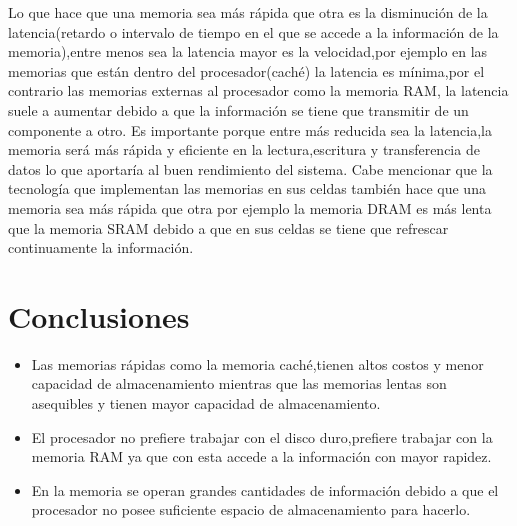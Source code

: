 \documentclass{article}
\begin{document}
Lo que hace que una memoria sea más rápida que otra es la disminución de la latencia(retardo o intervalo de tiempo en el que se  accede a la información de la memoria),entre menos sea la latencia mayor es la velocidad,por ejemplo en las memorias que están dentro del procesador(caché) la latencia es mínima,por el contrario las memorias externas al  procesador como la memoria RAM,  la latencia suele a aumentar debido a que  la información se tiene que transmitir de un componente a otro. 
Es importante  porque entre más reducida sea la latencia,la memoria será más rápida y eficiente en la lectura,escritura y transferencia de datos lo que aportaría al buen rendimiento del sistema.\newline
Cabe mencionar que la tecnología que implementan las memorias en sus celdas también hace que una memoria sea más rápida que otra por ejemplo la memoria DRAM es más lenta que la memoria SRAM debido a que en sus celdas se tiene que refrescar continuamente la información.
\newpage




\section{Conclusiones}
\begin{itemize}
    \item{Las memorias  rápidas como la memoria caché,tienen altos costos y menor capacidad de almacenamiento mientras que las memorias lentas son asequibles y tienen mayor capacidad de almacenamiento. }
    \item{El procesador no prefiere trabajar con el disco duro,prefiere trabajar con la memoria RAM ya que con esta  accede a la información con mayor rapidez.}
    \item{En la memoria se operan grandes cantidades de información debido a que el procesador no posee suficiente espacio de almacenamiento para hacerlo. }
\end{itemize}




\newpage
    




\end{document}
